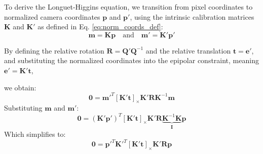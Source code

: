\documentclass[11pt,a4paper]{article}
\theoremstyle{definition}
\theoremstyle{plain}
\theoremstyle{remark}
\begin{document}
To derive the Longuet-Higgins equation, we transition from pixel coordinates to normalized camera coordinates $\mathbf{p}$ and $\mathbf{p'}$, using the intrinsic calibration matrices $\mathbf{K}$ and $\mathbf{K'}$ as defined in Eq. \eqref{eq:norm_coords_def}:
\begin{equation} \nonumber
    \mathbf{m} = \mathbf{K}\mathbf{p} \quad \text{and} \quad \mathbf{m'} = \mathbf{K'}\mathbf{p'}
\end{equation}

By defining the relative rotation $\mathbf{R} = \mathbf{Q'}\mathbf{Q}^{-1}$ and the relative translation $\mathbf{t} = \mathbf{e'}$, and substituting the normalized coordinates into the epipolar constraint, meaning
$\mathbf{e' = K't}$,
    
we obtain:
\begin{equation} \nonumber
    \mathbf{0} = \mathbf{m}'^{T} [\mathbf{K'}\mathbf{t}]_{\times} \mathbf{K'}\mathbf{R} \mathbf{K}^{-1} \mathbf{m}
\end{equation}
Substituting $\mathbf{m}$ and $\mathbf{m'}$:
\begin{equation} \nonumber
    \mathbf{0} = (\mathbf{K'}\mathbf{p'})^{T} [\mathbf{K'}\mathbf{t}]_{\times} \mathbf{K'}\mathbf{R} \underbrace{\mathbf{K}^{-1} \mathbf{K}}_{\mathbf{I}} \mathbf{p}
\end{equation}
Which simplifies to:
\begin{equation} \label{eq:intermediate_step}
    \mathbf{0} = \mathbf{p'}^{T} \mathbf{K'}^{T} [\mathbf{K'}\mathbf{t}]_{\times} \mathbf{K'}\mathbf{R} \mathbf{p}
\end{equation}
\end{document}
